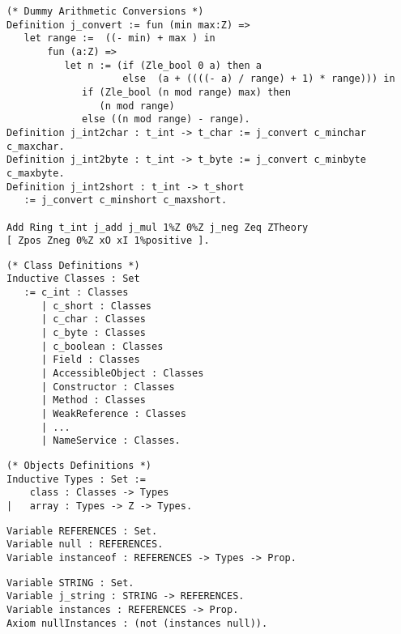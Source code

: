 \begin{verbatim}
(* Dummy Arithmetic Conversions *)
Definition j_convert := fun (min max:Z) =>
   let range :=  ((- min) + max ) in
       fun (a:Z) => 
          let n := (if (Zle_bool 0 a) then a
                    else  (a + ((((- a) / range) + 1) * range))) in
             if (Zle_bool (n mod range) max) then
                (n mod range)
             else ((n mod range) - range).
Definition j_int2char : t_int -> t_char := j_convert c_minchar c_maxchar.
Definition j_int2byte : t_int -> t_byte := j_convert c_minbyte c_maxbyte.
Definition j_int2short : t_int -> t_short 
   := j_convert c_minshort c_maxshort.

Add Ring t_int j_add j_mul 1%Z 0%Z j_neg Zeq ZTheory
[ Zpos Zneg 0%Z xO xI 1%positive ].

\end{verbatim}
\begin{verbatim}
(* Class Definitions *)
Inductive Classes : Set
   := c_int : Classes
      | c_short : Classes
      | c_char : Classes
      | c_byte : Classes
      | c_boolean : Classes
      | Field : Classes
      | AccessibleObject : Classes
      | Constructor : Classes
      | Method : Classes
      | WeakReference : Classes
      | ...
      | NameService : Classes.
\end{verbatim}
\begin{verbatim}
(* Objects Definitions *)
Inductive Types : Set :=
    class : Classes -> Types 
|   array : Types -> Z -> Types.
\end{verbatim}
\begin{verbatim}
Variable REFERENCES : Set.
Variable null : REFERENCES.
Variable instanceof : REFERENCES -> Types -> Prop.
\end{verbatim}
\begin{verbatim}
Variable STRING : Set.
Variable j_string : STRING -> REFERENCES.
Variable instances : REFERENCES -> Prop.
Axiom nullInstances : (not (instances null)).
\end{verbatim}
